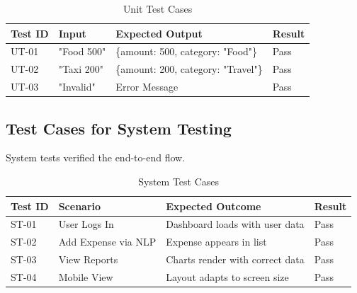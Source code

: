 \begin{table}[H]
\centering
\begin{tabular}{|l|l|l|l|}
\hline
\textbf{Test ID} & \textbf{Input} & \textbf{Expected Output} & \textbf{Result} \\ \hline
UT-01 & "Food 500" & \{amount: 500, category: "Food"\} & Pass \\ \hline
UT-02 & "Taxi 200" & \{amount: 200, category: "Travel"\} & Pass \\ \hline
UT-03 & "Invalid" & Error Message & Pass \\ \hline
\end{tabular}
\caption{Unit Test Cases}
\end{table}

\subsection{Test Cases for System Testing}
System tests verified the end-to-end flow.

\begin{table}[H]
\centering
\begin{tabular}{|l|l|l|l|}
\hline
\textbf{Test ID} & \textbf{Scenario} & \textbf{Expected Outcome} & \textbf{Result} \\ \hline
ST-01 & User Logs In & Dashboard loads with user data & Pass \\ \hline
ST-02 & Add Expense via NLP & Expense appears in list & Pass \\ \hline
ST-03 & View Reports & Charts render with correct data & Pass \\ \hline
ST-04 & Mobile View & Layout adapts to screen size & Pass \\ \hline
\end{tabular}
\caption{System Test Cases}
\end{table}
